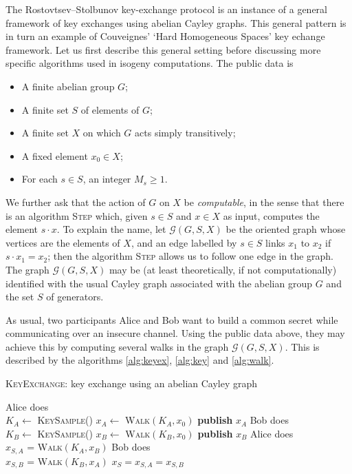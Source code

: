 \documentclass{article}
\newcommand{\Graph}{\mathcal{G}}
\newcommand{\algnamestyle}[1]{\textsc{#1}}
\theoremstyle{definition}
\begin{document}
The Rostovtsev--Stolbunov key-exchange protocol is an instance of a general
framework of key exchanges using abelian Cayley graphs. This general pattern
is in turn an example of Couveignes' `Hard Homogeneous Spaces' key echange
framework. Let us first describe this general
setting before discussing more specific algorithms used in isogeny computations.
The public data is
\begin{itemize}
\item A finite abelian group $G$;
\item A finite set $S$ of elements of $G$;
\item A finite set $X$ on which $G$ acts simply transitively;
\item A fixed element $x_0\in X$;
\item For each $s\in S$, an integer $M_s\geq 1$.
\end{itemize}
We further ask that the action of $G$ on $X$ be \emph{computable}, in the sense
 that there is an algorithm \algnamestyle{Step} which, given $s\in S$ and $x\in X$ as
input, computes the element $s\cdot x$. To explain the name, let $\Graph(G, S, X)$
be the oriented graph whose vertices are the elements of $X$, and an edge labelled
by $s\in S$ links $x_1$ to $x_2$ if $s\cdot x_1 = x_2$; then the algorithm
\algnamestyle{Step} allows us to follow one edge in the graph. The graph $\Graph(G, S, X)$
may be (at least theoretically, if not computationally) identified with the usual
Cayley graph associated with the abelian group $G$ and the set $S$ of generators.

As usual, two participants Alice and Bob want to build a common secret while
communicating over an insecure channel. Using the public data above, they may
achieve this by computing several walks in the graph $\Graph(G, S, X)$. This is
described by the algorithms \ref{alg:keyex}, \ref{alg:key} and \ref{alg:walk}.

\begin{algorithm}
    \caption{\algnamestyle{KeyExchange}: key exchange using an abelian Cayley graph}
    \label{alg:keyex}
    Alice does\\
			\quad $K_A \gets$ \algnamestyle{KeySample}()\;
			\quad $x_A \gets$ \algnamestyle{Walk}$(K_A, x_0)$\;
			\quad \textbf{publish} $x_A$ \;
		Bob does\\
			\quad $K_B \gets$ \algnamestyle{KeySample}()\;
			\quad $x_B \gets$ \algnamestyle{Walk}$(K_B, x_0)$\;
			\quad \textbf{publish} $x_B$ \;
		Alice does\\
			\quad $x_{S, A}$ = \algnamestyle{Walk}$(K_A, x_B)$\;
		Bob does\\
			\quad $x_{S, B}$ = \algnamestyle{Walk}$(K_B, x_A)$\;
		\Return $x_S = x_{S, A} = x_{S, B}$
\end{algorithm}
\end{document}
